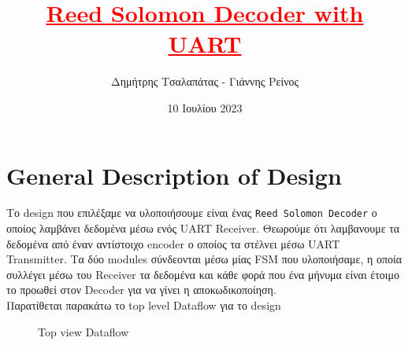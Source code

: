 \documentclass[12pt,a4paper]{article}
\title{\textbf{\textcolor{red}{\underline{Reed Solomon Decoder with UART}} } }
\author{Δημήτρης Τσαλαπάτας - Γιάννης Ρείνος}
\date{10 Ιουλίου 2023}
\begin{document}


	\maketitle
	\tableofcontents
	\newpage
	\section{\textcolor{PineGreen}{General Description of Design} }
    Το design που επιλέξαμε να υλοποιήσουμε είναι ένας \verb|Reed Solomon Decoder| ο οποίος λαμβάνει δεδομένα μέσω ενός UART Receiver. Θεωρούμε ότι λαμβανουμε τα δεδομένα από έναν αντίστοιχο encoder ο οποίος τα στέλνει μέσω UART Transmitter. Τα δύο modules σύνδεονται μέσω μίας FSM που υλοποιήσαμε, η οποία συλλέγει μέσω του Receiver τα δεδομένα και κάθε φορά που ένα μήνυμα είναι έτοιμο το προωθεί στον Decoder για να γίνει η αποκωδικοποίηση. \\
    Παρατίθεται παρακάτω το top level Dataflow για το design
    
     \begin{figure} [htbp]
     	\caption{Top view Dataflow}
     	\label{Top view Dataflow}
     \end{figure}
\end{document}
